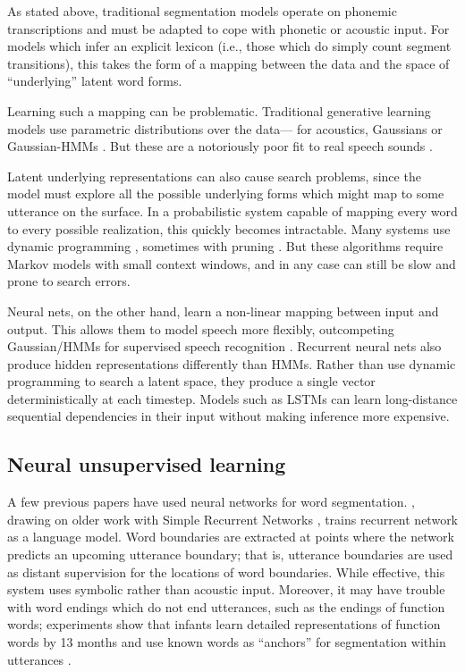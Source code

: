 \documentclass[11pt,letterpaper]{article}
\begin{document}
As stated above, traditional segmentation models operate on phonemic
transcriptions and must be adapted to cope with phonetic or acoustic
input. For models which infer an explicit lexicon (i.e., those which
do simply count segment transitions), this takes the form of a mapping
between the data and the space of ``underlying'' latent word
forms.

Learning such a mapping can be problematic. Traditional generative
learning models use parametric distributions over the data--- for
acoustics, Gaussians \cite{Vallabha07,Feldman09} or Gaussian-HMMs
\cite{Lee12,Lee15}. But these are a notoriously poor fit to real speech sounds
\cite{Glass?}.

Latent underlying representations can also cause search problems,
since the model must explore all the possible underlying forms which
might map to some utterance on the surface. In a probabilistic system
capable of mapping every word to every possible realization, this
quickly becomes intractable. Many systems use dynamic programming
\cite{Mochihashi09,Neubig10}, sometimes with pruning
\cite{vanGael08}. But these algorithms require Markov models with
small context windows, and in any case can still be slow and prone to
search errors.

Neural nets, on the other hand, learn a non-linear mapping between
input and output. This allows them to model speech more flexibly,
outcompeting Gaussian/HMMs for supervised speech recognition
\cite{xxx}. Recurrent neural nets also produce hidden representations
differently than HMMs. Rather than use dynamic programming to search a
latent space, they produce a single vector deterministically at each
timestep. Models such as LSTMs \cite{Hochreiter97} can learn
long-distance sequential dependencies in their input without making
inference more expensive.

\subsection{Neural unsupervised learning}
\label{sub-neural}

A few previous papers have used neural networks for word
segmentation. , drawing on older work with
Simple Recurrent Networks \cite{Elman90}, trains recurrent network as
a language model. Word boundaries are extracted at points where the
network predicts an upcoming utterance boundary; that is, utterance
boundaries are used as distant supervision for the locations of word
boundaries. While effective, this system uses symbolic rather than
acoustic input. Moreover, it may have trouble with word endings which
do not end utterances, such as the endings of function words;
experiments show that infants learn detailed representations of
function words by 13 months \cite{Shi06} and use known words as
``anchors'' for segmentation within utterances \cite{Bortfeld05}.
\end{document}
